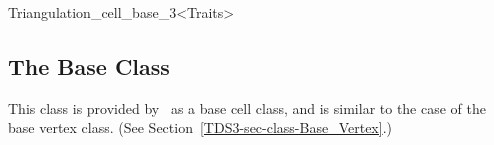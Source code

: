 	\begin{ccClassTemplate}{Triangulation_cell_base_3<Traits>}
	\subsection{The Base Class \protect {}}

This class is provided by \cgal\ as a base cell class, and is similar
to the case of the base vertex class. (See
Section~\ref{TDS3-sec-class-Base_Vertex}.)


	\end{ccClassTemplate} 
